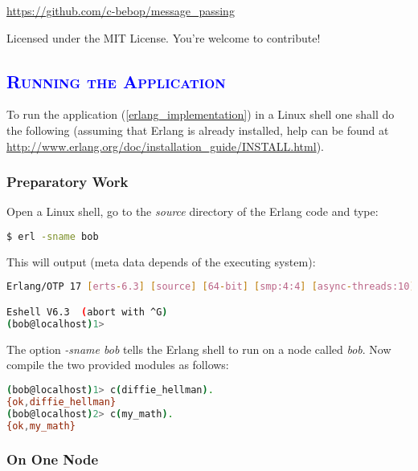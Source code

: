 \documentclass[xcolor=dvipsnames]{article}
\begin{document}
\begin{center}
\url{https://github.com/c-bebop/message_passing}
\end{center}

\noindent Licensed under the MIT License. You're welcome to contribute!



\subsection{\scshape{\textcolor{blue}{Running the Application}}}

To run the application (\ref{erlang_implementation}) in a Linux shell one shall do the following (assuming that Erlang is already installed, help can be found at \url{http://www.erlang.org/doc/installation_guide/INSTALL.html}).

\subsubsection{Preparatory Work}

\noindent Open a Linux shell, go to the \textit{source} directory of the Erlang code and type:

\begin{lstlisting}[language=bash, numbers=none]
$ erl -sname bob
\end{lstlisting}

\noindent This will output (meta data depends of the executing system):

\begin{lstlisting}[language=bash]
Erlang/OTP 17 [erts-6.3] [source] [64-bit] [smp:4:4] [async-threads:10] [hipe] [kernel-poll:false]

Eshell V6.3  (abort with ^G)
(bob@localhost)1> 
\end{lstlisting}

\noindent The option \textit{-sname bob} tells the Erlang shell to run on a node called \textit{bob}. Now compile the two provided modules as follows:

\begin{lstlisting}[language=bash]
(bob@localhost)1> c(diffie_hellman).
{ok,diffie_hellman}
(bob@localhost)2> c(my_math).
{ok,my_math}
\end{lstlisting}

\subsubsection{On One Node}
\end{document}
